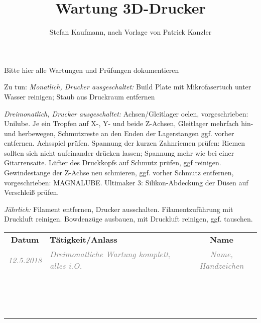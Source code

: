 \documentclass{\basedir/tph-document}
\title{Wartung 3D-Drucker}
\author{Stefan Kaufmann, nach Vorlage von Patrick Kanzler}
\newcommand{\thickhline}{\noalign{\hrule height 2pt}}
\begin{document}
Bitte hier alle Wartungen und Prüfungen dokumentieren

Zu tun: \emph{Monatlich, Drucker ausgeschaltet:} Build Plate mit Mikrofasertuch unter Wasser reinigen; Staub aus Druckraum entfernen

\emph{Dreimonatlich, Drucker ausgeschaltet:} Achsen/Gleitlager oelen, vorgeschrieben: Unilube. Je ein Tropfen auf X-, Y- und beide Z-Achsen, Gleitlager mehrfach hin- und herbewegen, Schmutzreste an den Enden der Lagerstangen ggf. vorher entfernen. Achsspiel prüfen. Spannung der kurzen Zahnriemen prüfen: Riemen sollten sich nicht aufeinander drücken lassen; Spannung mehr wie bei einer Gitarrensaite. Lüfter des Druckkopfs auf Schmutz prüfen, ggf reinigen. Gewindestange der Z-Achse neu schmieren, ggf. vorher Schmutz entfernen, vorgeschrieben: MAGNALUBE. Ultimaker 3: Silikon-Abdeckung der Düsen auf Verschleiß prüfen.

\emph{Jährlich:} Filament entfernen, Drucker ausschalten. Filamentzuführung mit Druckluft reinigen. Bowdenzüge ausbauen, mit Druckluft reinigen, ggf. tauschen.

\newcommand{\bsp}[1]{\textcolor{gray}{\itshape #1}}
\newcommand{\beispielzeile}[5]{\bsp{#2} & \bsp{#3} & \bsp{#4} \\ \hline}
\newcommand{\leerzeile}{\vbox{\vspace{2.4em}} & & \\ \hline}
\vspace{-.4em}
\begin{tabularx}{\textwidth}{|c|X|c|} \hline
\bfseries Datum      &  \bfseries Tätigkeit/Anlass  & \bfseries Name \\\thickhline
\beispielzeile{BSP}{12.5.2018}{ Dreimonatliche Wartung komplett, alles i.O. }{Name, Handzeichen}
\leerzeile
\leerzeile
\leerzeile
\leerzeile
\leerzeile
\leerzeile
\leerzeile
\leerzeile
\leerzeile
\leerzeile
\leerzeile
\leerzeile
\leerzeile
\leerzeile
\leerzeile
\leerzeile
\end{tabularx}
\end{document}
